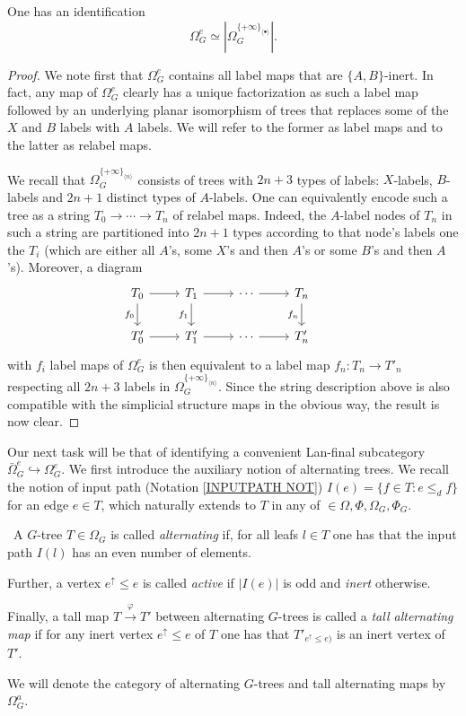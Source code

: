 \documentclass[a4paper,10pt]{article}%
\begin{document}
\begin{proposition}
One has an identification
\[
\Omega_G^e \simeq 
|\Omega_{G}^{\{+\infty\}_{\langle \bullet \rangle}}|.
\]
\end{proposition}


\begin{proof}
We note first that $\Omega_{G}^e$ contains all label maps that are $\{A,B\}$-inert. In fact, any map of $\Omega_{G}^e$ clearly has a unique factorization as such a label map followed by an underlying planar isomorphism of trees that replaces some of the $X$ and $B$ labels with $A$ labels.
We will refer to the former as label maps and to the latter as relabel maps.

We recall that 
$\Omega_{G}^{\{+\infty\}_{\langle n \rangle}}$
consists of trees with $2n+3$ types of labels: 
$X$-labels, $B$-labels and $2n+1$ distinct types of $A$-labels.
One can equivalently encode such a tree as a string 
$T_0 \to \cdots \to T_n$
of relabel maps. Indeed, the $A$-label nodes of $T_n$ in such a string are partitioned into $2n+1$ types according to that node's labels one the $T_i$ (which are either all $A$'s, some $X$'s and then $A$'s or some $B$'s and then $A$'s).
Moreover, a diagram
\[
\begin{tikzcd}
	T_0 \ar{r} \ar{d}[swap]{f_0} & 
	T_1 \ar{r} \ar{d}[swap]{f_1} & 
	\cdots \ar{r} &
	T_n \ar{d}[swap]{f_n} &
\\
	T'_0 \ar{r} &
	T'_1 \ar{r} &
	\cdots \ar{r} &
	T'_n 
\end{tikzcd}
\]
with $f_i$ label maps of $\Omega^{e}_G$ is then equivalent to a label map $f_n \colon T_n \to T'_n$ respecting all $2n+3$ labels 
in $\Omega_{G}^{\{+\infty\}_{\langle n \rangle}}$.
Since the string description above is also compatible with the simplicial structure maps in the obvious way, 
the result is now clear. 
\end{proof}


Our next task will be that of identifying a convenient Lan-final subcategory $\bar{\Omega}_G^{e} \hookrightarrow \Omega_G^e$.
We first introduce the auxiliary notion of alternating trees.
We recall the notion of input path (Notation \ref{INPUTPATH NOT})
$I(e) = \{f \in T \colon e \leq_d f\}$ for an edge $e \in T$, which naturally extends to $T$ in any of $\in \Omega, \Phi, \Omega_G, \Phi_G$.

\begin{definition}\
A $G$-tree $T \in \Omega_G$ is called \textit{alternating} if, for all leafs $l \in T$ one has that the input path $I(l)$ has an even number of elements.

Further, a vertex $e^{\uparrow} \leq e$ is called \textit{active}
if $|I(e)|$ is odd and \textit{inert} otherwise.

Finally, a tall map $T \xrightarrow{\varphi} T'$ between alternating $G$-trees is called a 
\textit{tall alternating map}
if for any inert vertex $e^{\uparrow} \leq e$ of $T$ one has that 
$T'_{ e^{\uparrow} \leq e)}$ is an inert vertex of $T'$.

We will denote the category of alternating $G$-trees and tall alternating maps by $\Omega_G^a$.
\end{definition}
\end{document}
